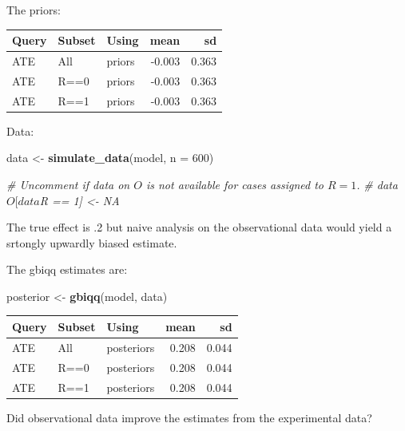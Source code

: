 \documentclass[12pt,]{book}
\newenvironment{Shaded}{\begin{snugshade}}{\end{snugshade}}
\newcommand{\CommentTok}[1]{\textcolor[rgb]{0.56,0.35,0.01}{\textit{#1}}}
\newcommand{\DataTypeTok}[1]{\textcolor[rgb]{0.13,0.29,0.53}{#1}}
\newcommand{\DecValTok}[1]{\textcolor[rgb]{0.00,0.00,0.81}{#1}}
\newcommand{\KeywordTok}[1]{\textcolor[rgb]{0.13,0.29,0.53}{\textbf{#1}}}
\newcommand{\NormalTok}[1]{#1}
\newcommand{\OperatorTok}[1]{\textcolor[rgb]{0.81,0.36,0.00}{\textbf{#1}}}
\newcommand{\StringTok}[1]{\textcolor[rgb]{0.31,0.60,0.02}{#1}}
\begin{document}
The priors:

\begin{tabular}{l|l|l|r|r}
\hline
Query & Subset & Using & mean & sd\\
\hline
ATE & All & priors & -0.003 & 0.363\\
\hline
ATE & R==0 & priors & -0.003 & 0.363\\
\hline
ATE & R==1 & priors & -0.003 & 0.363\\
\hline
\end{tabular}

Data:

\begin{Shaded}
\begin{Highlighting}[]
\NormalTok{data <-}\StringTok{ }\KeywordTok{simulate_data}\NormalTok{(model, }\DataTypeTok{n =} \DecValTok{600}\NormalTok{)}

\CommentTok{# Uncomment if data on $O$ is not available for cases assigned to $R=1$.}
\CommentTok{# data$O[data$R == 1] <- NA   }
\end{Highlighting}
\end{Shaded}

The true effect is .2 but naive analysis on the observational data would yield a srtongly upwardly biased estimate.

The gbiqq estimates are:

\begin{Shaded}
\begin{Highlighting}[]
\NormalTok{posterior <-}\StringTok{ }\KeywordTok{gbiqq}\NormalTok{(model, data)}
\end{Highlighting}
\end{Shaded}

\begin{tabular}{l|l|l|r|r}
\hline
Query & Subset & Using & mean & sd\\
\hline
ATE & All & posteriors & 0.208 & 0.044\\
\hline
ATE & R==0 & posteriors & 0.208 & 0.044\\
\hline
ATE & R==1 & posteriors & 0.208 & 0.044\\
\hline
\end{tabular}

Did observational data improve the estimates from the experimental data?

\begin{Shaded}
\end{Shaded}
\end{document}
